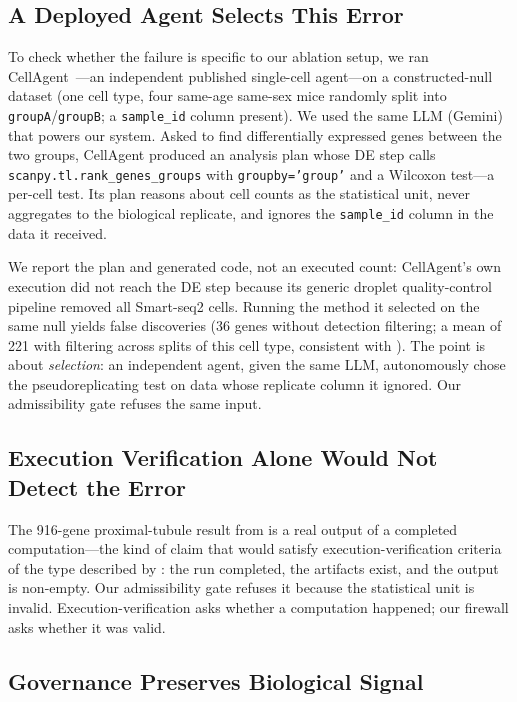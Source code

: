 \documentclass[pmlr,twocolumn,10pt]{jmlr}
\begin{document}
\subsection{A Deployed Agent Selects This Error}
\label{sec:wildagent}

To check whether the failure is specific to our ablation setup, we ran
CellAgent~\citep{xiao2024cellagent}---an independent published single-cell
agent---on a constructed-null dataset (one cell type, four same-age same-sex mice
randomly split into \texttt{groupA}/\texttt{groupB}; a \texttt{sample\_id} column
present). We used the same LLM (Gemini) that powers our system. Asked to find
differentially expressed genes between the two groups, CellAgent produced an
analysis plan whose DE step calls \texttt{scanpy.tl.rank\_genes\_groups} with
\texttt{groupby='group'} and a Wilcoxon test---a per-cell test. Its plan reasons
about cell counts as the statistical unit, never aggregates to the biological
replicate, and ignores the \texttt{sample\_id} column in the data it received.

We report the plan and generated code, not an executed count: CellAgent's own
execution did not reach the DE step because its generic droplet quality-control
pipeline removed all Smart-seq2 cells. Running the method it selected on the same
null yields false discoveries (36 genes without detection filtering; a mean of
221 with filtering across splits of this cell type, consistent with
). The point is about \textit{selection}: an independent
agent, given the same LLM, autonomously chose the pseudoreplicating test on data
whose replicate column it ignored. Our admissibility gate refuses the same input.

\subsection{Execution Verification Alone Would Not Detect the Error}

The 916-gene proximal-tubule result from  is a real output of
a completed computation---the kind of claim that would satisfy
execution-verification criteria of the type described by
\citet{evibound2025}: the run completed, the artifacts exist, and the output is
non-empty. Our admissibility gate refuses it because the statistical unit is
invalid. Execution-verification asks whether a computation happened; our
firewall asks whether it was valid.

\subsection{Governance Preserves Biological Signal}
\end{document}
